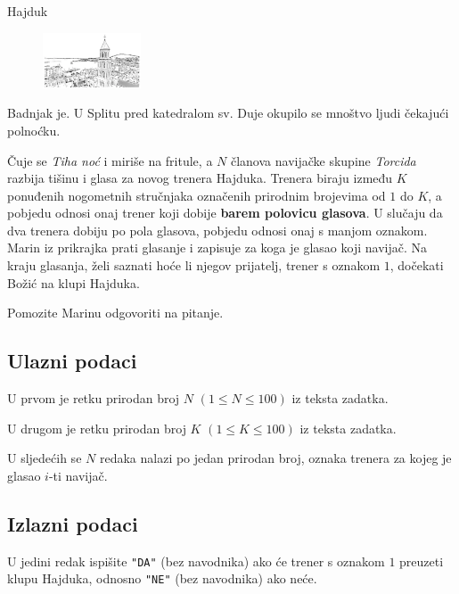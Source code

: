 \begin{statement}[
  problempoints=30,
  timelimit=1 sekunda,
  memorylimit=512 MiB,
]{Hajduk}

\setlength\intextsep{-0.1cm}
\begin{figure}
\centering
\includegraphics[width=0.26\textwidth]{img/split.png}
\end{figure}

Badnjak je. U Splitu pred katedralom sv. Duje okupilo se mnoštvo ljudi čekajući
polnoćku.

Čuje se \textit{Tiha noć} i miriše na fritule, a $N$ članova navijačke skupine
\textit{Torcida} razbija tišinu i glasa za novog trenera Hajduka. Trenera biraju
između $K$ ponuđenih nogometnih stručnjaka označenih prirodnim brojevima od $1$
do $K$, a pobjedu odnosi onaj trener koji dobije \textbf{barem polovicu
glasova}.  U slučaju da dva trenera dobiju po pola glasova, pobjedu odnosi
onaj s manjom oznakom.  Marin iz prikrajka prati glasanje i zapisuje za koga
je glasao koji navijač.  Na kraju glasanja, želi saznati hoće li njegov
prijatelj, trener s oznakom $1$, dočekati Božić na klupi Hajduka.

Pomozite Marinu odgovoriti na pitanje.


\subsection*{Ulazni podaci}
U prvom je retku prirodan broj $N$ $(1 \le N \le 100)$ iz teksta zadatka.

U drugom je retku prirodan broj $K$ $(1 \le K \le 100)$ iz teksta zadatka.

U sljedećih se $N$ redaka nalazi po jedan prirodan broj, oznaka trenera za kojeg
je glasao $i$-ti navijač.

\subsection*{Izlazni podaci}
U jedini redak ispišite \texttt{"DA"} (bez navodnika) ako će trener s oznakom
$1$ preuzeti klupu Hajduka, odnosno \texttt{"NE"} (bez navodnika) ako neće.


\end{statement}
